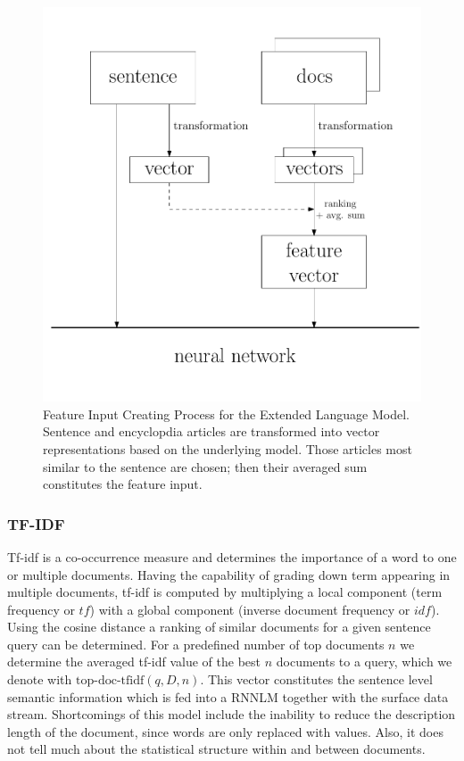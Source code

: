 \documentclass[a4paper]{article}
\begin{document}
\begin{figure} 
\centering 
\includegraphics[width=\columnwidth]{flow.pdf}
\caption{Feature Input Creating Process for the Extended Language Model. Sentence and encyclopdia articles are transformed into vector representations based on the underlying model. Those articles most similar to the sentence are chosen; then their averaged sum constitutes the feature input.}
\label{fig:flow}
\end{figure}

\subsubsection{TF-IDF}
Tf-idf \cite{salton1986introduction} is a co-occurrence measure and determines the importance of a word to one or multiple documents. Having the capability of grading down term appearing in multiple documents, tf-idf is computed by multiplying a local component (term frequency or $tf$) with a global component (inverse document frequency or $idf$).
Using the cosine distance a ranking of similar documents for a given sentence query can be determined.
For a predefined number of top documents $n$ we determine the averaged tf-idf value of the best $n$ documents to a query, which we denote with $\text{top-doc-tfidf}(q, D, n)$.
This vector constitutes the sentence level semantic information which is fed into a RNNLM together with the surface data stream.
Shortcomings of this model include the inability to reduce the description length of the document, since words are only replaced with values. Also, it does not tell much about the statistical structure within and between documents.
\end{document}
